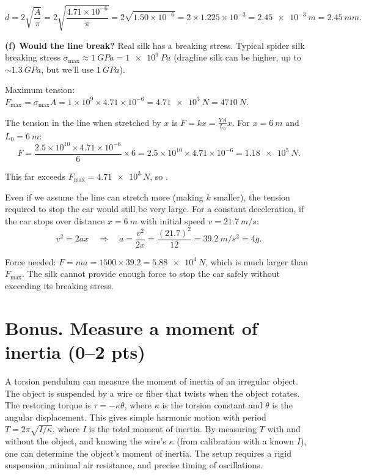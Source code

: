 \documentclass[11pt]{article}
\newcommand{\ans}[1]{\boxed{\displaystyle #1}}
\begin{document}
\[ d = 2\sqrt{\frac{A}{\pi}} = 2\sqrt{\frac{4.71 \times 10^{-6}}{\pi}} = 2\sqrt{1.50 \times 10^{-6}} = 2 \times 1.225 \times 10^{-3} = \ans{\SI{2.45e-3}{m} = \SI{2.45}{mm}}. \]

\textbf{(f) Would the line break?} Real silk has a breaking stress. Typical spider silk breaking stress $\sigma_{\text{max}} \approx \SI{1}{GPa} = \SI{1e9}{Pa}$ (dragline silk can be higher, up to $\sim\SI{1.3}{GPa}$, but we'll use $\SI{1}{GPa}$).

Maximum tension: $F_{\text{max}} = \sigma_{\text{max}} A = 1 \times 10^9 \times 4.71 \times 10^{-6} = \SI{4.71e3}{N} = \SI{4710}{N}$.

The tension in the line when stretched by $x$ is $F = kx = \frac{YA}{L_0}x$. For $x = \SI{6}{m}$ and $L_0 = \SI{6}{m}$:
\[ F = \frac{2.5 \times 10^{10} \times 4.71 \times 10^{-6}}{6} \times 6 = 2.5 \times 10^{10} \times 4.71 \times 10^{-6} = \SI{1.18e5}{N}. \]

This far exceeds $F_{\text{max}} = \SI{4.71e3}{N}$, so \ans{the line would break}. 

Even if we assume the line can stretch more (making $k$ smaller), the tension required to stop the car would still be very large. For a constant deceleration, if the car stops over distance $x = \SI{6}{m}$ with initial speed $v = \SI{21.7}{m/s}$:
\[ v^2 = 2ax \quad\Rightarrow\quad a = \frac{v^2}{2x} = \frac{(21.7)^2}{12} = \SI{39.2}{m/s^2} = 4g. \]

Force needed: $F = ma = 1500 \times 39.2 = \SI{5.88e4}{N}$, which is much larger than $F_{\text{max}}$. The silk cannot provide enough force to stop the car safely without exceeding its breaking stress.

\section*{Bonus. Measure a moment of inertia (0--2 pts)}
A torsion pendulum can measure the moment of inertia of an irregular object. The object is suspended by a wire or fiber that twists when the object rotates. The restoring torque is $\tau = -\kappa\theta$, where $\kappa$ is the torsion constant and $\theta$ is the angular displacement. This gives simple harmonic motion with period $T = 2\pi\sqrt{I/\kappa}$, where $I$ is the total moment of inertia. By measuring $T$ with and without the object, and knowing the wire's $\kappa$ (from calibration with a known $I$), one can determine the object's moment of inertia. The setup requires a rigid suspension, minimal air resistance, and precise timing of oscillations.
\end{document}
